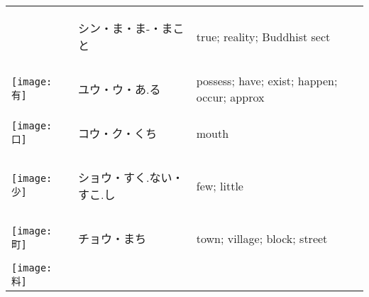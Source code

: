 \documentclass[a4paper,12pt]{extarticle}
\begin{document}
\begin{longtable}{|lp{6cm}p{4cm}|}
\begin{minipage}{0.3\textwidth}
{}
\end{minipage}
&
\begin{CJK}{UTF8}{min}シン・ま・ま-・まこと\end{CJK}
&
true; reality; Buddhist sect
\\ 
\begin{minipage}{0.3\textwidth}
\centerline{
	\texttt{[image: 有]}
}
\end{minipage}
&
\begin{CJK}{UTF8}{min}ユウ・ウ・あ.る\end{CJK}
&
possess; have; exist; happen; occur; approx
\\ 
\begin{minipage}{0.3\textwidth}
\centerline{
	\texttt{[image: 口]}
}
\end{minipage}
&
\begin{CJK}{UTF8}{min}コウ・ク・くち\end{CJK}
&
mouth
\\ 
\begin{minipage}{0.3\textwidth}
\centerline{
	\texttt{[image: 少]}
}
\end{minipage}
&
\begin{CJK}{UTF8}{min}ショウ・すく.ない・すこ.し\end{CJK}
&
few; little
\\ 
\begin{minipage}{0.3\textwidth}
\centerline{
	\texttt{[image: 町]}
}
\end{minipage}
&
\begin{CJK}{UTF8}{min}チョウ・まち\end{CJK}
&
town; village; block; street
\\ 
\begin{minipage}{0.3\textwidth}
\centerline{
	\texttt{[image: 料]}
}
\end{minipage}
\end{longtable}
\end{document}

